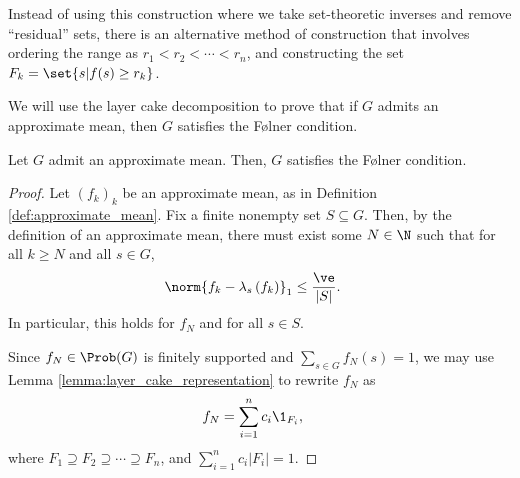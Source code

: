 \begin{remark}
  Instead of using this construction where we take set-theoretic inverses and remove ``residual'' sets, there is an alternative method of construction that involves ordering the range as $r_1 < r_2< \cdots < r_n$, and constructing the set $F_k = \set{s | f(s) \geq r_k}$.
\end{remark}


We will use the layer cake decomposition to prove that if $G$ admits an approximate mean, then $G$ satisfies the Følner condition.
\begin{proposition}
  Let $G$ admit an approximate mean. Then, $G$ satisfies the Følner condition.
\end{proposition}
\begin{proof}
  Let $\left(f_k\right)_k$ be an approximate mean, as in Definition \ref{def:approximate_mean}. Fix a finite nonempty set $S \subseteq G$. Then, by the definition of an approximate mean, there must exist some $N\in\N$ such that for all $k\geq N$ and all $s\in G$,
  \begin{align*}
    \norm{f_k - \lambda_s\left(f_k\right)}_{1} &\leq \frac{\ve}{|S|}.
  \end{align*}
  In particular, this holds for $f_N$ and for all $s\in S$.\newline

  Since $f_N\in \Prob(G)$ is finitely supported and $\sum_{s\in G}f_N(s) = 1$, we may use Lemma \ref{lemma:layer_cake_representation} to rewrite $f_N$ as
  \begin{align*}
    f_N &= \sum_{i=1}^{n}c_i\1_{F_i},
  \end{align*}
  where $F_1 \supseteq F_2\supseteq \cdots \supseteq F_n$, and $\sum_{i=1}^{n}c_i\left\vert F_i \right\vert = 1$.\newline


\end{proof}
